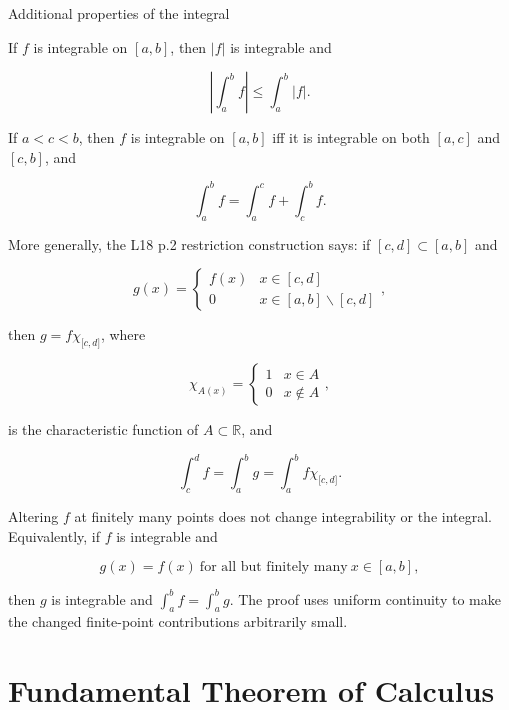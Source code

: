 \begin{theorem}{Additional properties of the integral}

If \(f\) is integrable on \(\left\lbrack {a,b} \right\rbrack\), then \(|f|\) is integrable and

\[\left| {\int_{a}^{b}f} \right| \leq \int_{a}^{b}|f|.\]

If \(a < c < b\), then \(f\) is integrable on \(\left\lbrack {a,b} \right\rbrack\) iff it is integrable on both \(\left\lbrack {a,c} \right\rbrack\) and \(\left\lbrack {c,b} \right\rbrack\), and

\[\int_{a}^{b}f = \int_{a}^{c}f + \int_{c}^{b}f.\]

More generally, the L18 p.2 restriction construction says: if \(\left\lbrack {c,d} \right\rbrack \subset \left\lbrack {a,b} \right\rbrack\) and

\[g(x) = \left\{ \begin{matrix}
{f(x)} & {x \in \left\lbrack {c,d} \right\rbrack} \\
0 & {x \in \left\lbrack {a,b} \right\rbrack \smallsetminus \left\lbrack {c,d} \right\rbrack}
\end{matrix} \right.,\]

then \(g = f\chi_{\lbrack{c,d}\rbrack}\), where

\[\chi_{A{(x)}} = \left\{ \begin{matrix}
1 & {x \in A} \\
0 & {x \notin A}
\end{matrix} \right.,\]

is the characteristic function of \(A \subset \mathbb{R}\), and

\[\int_{c}^{d}f = \int_{a}^{b}g = \int_{a}^{b}f\chi_{\lbrack{c,d}\rbrack}.\]

Altering \(f\) at finitely many points does not change integrability or the integral. Equivalently, if \(f\) is integrable and

\[g(x) = f(x)\ \text{for all but finitely many}\ x \in \left\lbrack {a,b} \right\rbrack,\]

then \(g\) is integrable and \(\int_{a}^{b}f = \int_{a}^{b}g\). The proof uses uniform continuity to make the changed finite-point contributions arbitrarily small.

\end{theorem}

\section{Fundamental Theorem of Calculus}

